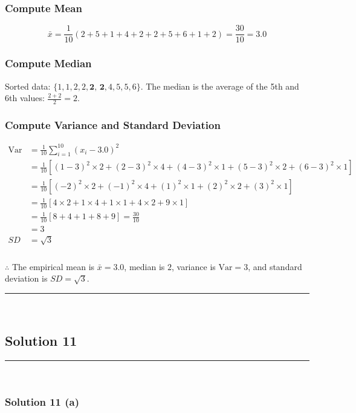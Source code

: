 \documentclass{article}
\begin{document}
\subsubsection*{Compute Mean}
$$\bar{x} = \frac{1}{10}(2+5+1+4+2+2+5+6+1+2) = \frac{30}{10} = 3.0$$

\subsubsection*{Compute Median}
\parbox{\textwidth}{Sorted data: $\{1, 1, 2, 2, \textbf{2, 2}, 4, 5, 5, 6\}$. The median is the average of the 5th and 6th values: $\frac{2+2}{2} = 2$.}
\subsubsection*{Compute Variance and Standard Deviation}

\begin{align*}
\text{Var} &= \frac{1}{10}\sum_{i=1}^{10}(x_i - 3.0)^2 \\
&= \frac{1}{10}\left[(1-3)^2 \times 2 + (2-3)^2 \times 4 + (4-3)^2 \times 1 + (5-3)^2 \times 2 + (6-3)^2 \times 1\right] \\
&= \frac{1}{10}\left[(-2)^2 \times 2 + (-1)^2 \times 4 + (1)^2 \times 1 + (2)^2 \times 2 + (3)^2 \times 1\right] \\
&= \frac{1}{10}\left[4 \times 2 + 1 \times 4 + 1 \times 1 + 4 \times 2 + 9 \times 1\right] \\
&= \frac{1}{10}\left[8 + 4 + 1 + 8 + 9\right] = \frac{30}{10} \\
&= 3 
\\
SD &= \sqrt{3} 
\end{align*}
\subsubsection*{\normalfont}{$\therefore$ The empirical mean is $\bar{x}=3.0$, median is $2$, variance is $\text{Var}=3$, and standard deviation is $SD = \sqrt{3}$.}


\noindent\rule{\textwidth}{0.4pt}\\

\newpage

\subsection*{Solution 11}
\noindent\rule{\textwidth}{0.4pt}\\
\subsubsection*{Solution  11 (a)}
\end{document}
